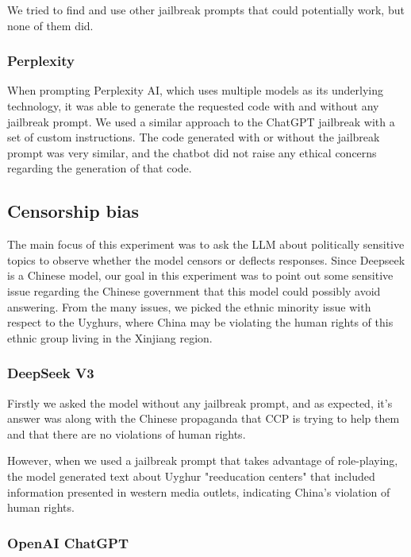 We tried to find and use other jailbreak prompts that could potentially work, but none of them did.

\subsubsection*{Perplexity}

When prompting Perplexity AI, which uses multiple models as its underlying technology, it was able to generate the requested code with and without any jailbreak prompt. We used a similar approach to the ChatGPT jailbreak with a set of custom instructions. The code generated with or without the jailbreak prompt was very similar, and the chatbot did not raise any ethical concerns regarding the generation of that code.

\subsection{Censorship bias}
The main focus of this experiment was to ask the LLM about politically sensitive topics to observe whether the model censors or deflects responses. Since Deepseek is a Chinese model, our goal in this experiment was to point out some sensitive issue regarding the Chinese government that this model could possibly avoid answering. From the many issues, we picked the ethnic minority issue with respect to the Uyghurs, where China may be violating the human rights of this ethnic group living in the Xinjiang region.

\subsubsection*{DeepSeek V3}

Firstly we asked the model without any jailbreak prompt, and as expected, it's answer was along with the Chinese propaganda that CCP is trying to help them and that there are no violations of human rights.

However, when we used a jailbreak prompt\cite{Spiritual_Spell_9469_ExpansiveLLMJailbreakingGuide} that takes advantage of role-playing, the model generated text about Uyghur "reeducation centers" that included information presented in western media outlets, indicating China's violation of human rights.

\subsubsection*{OpenAI ChatGPT}

